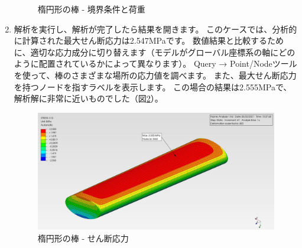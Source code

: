 \begin{enumerate}
\begin{figure}[H]
	\caption{楕円形の棒 - 境界条件と荷重}
	\label{fig:03-02}
	\end{figure}
\item
  解析を実行し、解析が完了したら結果を開きます。
  このケースでは、分析的に計算された最大せん断応力は2.547MPaです。
  数値結果と比較するために、適切な応力成分に切り替えます（モデルがグローバル座標系の軸にどのように配置されているかによって異なります）。
  Query → Point/Nodeツールを使って、棒のさまざまな場所の応力値を調べます。
  また、最大せん断応力を持つノードを指すラベルを表示します。
  この場合の結果は2.555MPaで、解析解に非常に近いものでした（図\ref{fig:03-03}）。
	\begin{figure}[H]
	\centering
	\includegraphics[width=150mm]{fig/03-03.png}
	\caption{楕円形の棒 - せん断応力}
	\label{fig:03-03}
	\end{figure}
\end{enumerate}